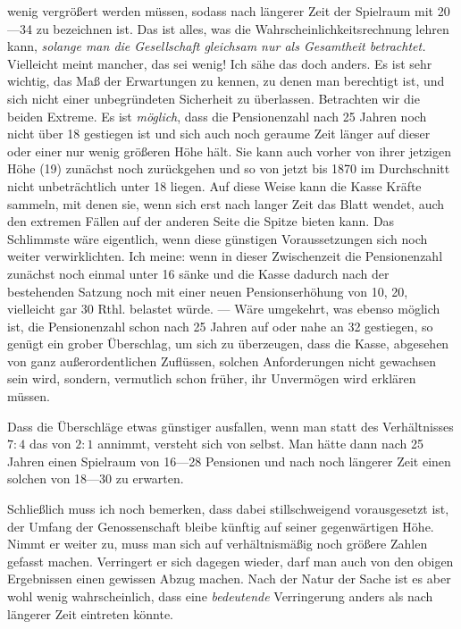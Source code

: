 wenig vergrößert werden müssen, sodass nach längerer Zeit der Spielraum mit 20—34 zu bezeichnen ist. Das ist alles, was die Wahrscheinlichkeitsrechnung lehren kann, \textit{solange man die Gesellschaft gleichsam nur als Gesamtheit betrachtet.} Vielleicht meint mancher, das sei wenig! Ich sähe das doch anders. Es ist sehr wichtig, das Maß der Erwartungen zu kennen, zu denen man berechtigt ist, und sich nicht einer unbegründeten Sicherheit zu überlassen. Betrachten wir die beiden Extreme. Es ist \textit{möglich}, dass die Pensionenzahl nach 25 Jahren noch nicht über 18 gestiegen ist und sich auch noch geraume Zeit länger auf dieser oder einer nur wenig größeren Höhe hält. Sie kann auch vorher von ihrer jetzigen Höhe (19) zunächst noch zurückgehen und so von jetzt bis 1870 im Durchschnitt nicht unbeträchtlich unter 18 liegen. Auf diese Weise kann die Kasse Kräfte sammeln, mit denen sie, wenn sich erst nach langer Zeit das Blatt wendet, auch den extremen Fällen auf der anderen Seite die Spitze bieten kann. Das Schlimmste wäre eigentlich, wenn diese günstigen Voraussetzungen sich noch weiter verwirklichten. Ich meine: wenn in dieser Zwischenzeit die Pensionenzahl zunächst noch einmal unter 16 sänke und die Kasse dadurch nach der bestehenden Satzung noch mit einer neuen Pensionserhöhung von 10, 20, vielleicht gar 30 Rthl. belastet würde. — Wäre umgekehrt, was ebenso möglich ist, die Pensionenzahl schon nach 25 Jahren auf oder nahe an 32 gestiegen, so genügt ein grober Überschlag, um sich zu überzeugen, dass die Kasse, abgesehen von ganz außerordentlichen Zuflüssen, solchen Anforderungen nicht gewachsen sein wird, sondern, vermutlich schon früher, ihr Unvermögen wird erklären müssen.

Dass die Überschläge etwas günstiger ausfallen, wenn man statt des Verhältnisses \(7:4\) das von \(2:1\) annimmt, versteht sich von selbst. Man hätte dann nach 25 Jahren einen Spielraum von 16—28 Pensionen und nach noch längerer Zeit einen solchen von 18—30 zu erwarten.

Schließlich muss ich noch bemerken, dass dabei stillschweigend vorausgesetzt ist, der Umfang der Genossenschaft bleibe künftig auf seiner gegenwärtigen Höhe. Nimmt er weiter zu, muss man sich auf verhältnismäßig noch größere Zahlen gefasst machen. Verringert er sich dagegen wieder, darf man auch von den obigen Ergebnissen einen gewissen Abzug machen. Nach der Natur der Sache ist es aber wohl wenig wahrscheinlich, dass eine \textit{bedeutende} Verringerung anders als nach längerer Zeit eintreten könnte.

